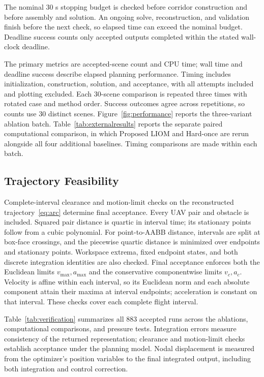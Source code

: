 The nominal 30 s stopping budget is checked before corridor construction and before assembly and solution. An ongoing solve, reconstruction, and validation finish before the next check, so elapsed time can exceed the nominal budget. Deadline success counts only accepted outputs completed within the stated wall-clock deadline.

The primary metrics are accepted-scene count and CPU time; wall time and deadline success describe elapsed planning performance. Timing includes initialization, construction, solution, and acceptance, with all attempts included and plotting excluded. Each 30-scene comparison is repeated three times with rotated case and method order. Success outcomes agree across repetitions, so counts use 30 distinct scenes. Figure~\ref{fig:performance} reports the three-variant ablation batch. Table~\ref{tab:externalresults} reports the separate paired computational comparison, in which Proposed LIOM and Hard-once are rerun alongside all four additional baselines. Timing comparisons are made within each batch.

\subsection{Trajectory Feasibility}
Complete-interval clearance and motion-limit checks on the reconstructed trajectory~\eqref{eq:arc} determine final acceptance. Every UAV pair and obstacle is included. Squared pair distance is quartic in interval time; its stationary points follow from a cubic polynomial. For point-to-AABB distance, intervals are split at box-face crossings, and the piecewise quartic distance is minimized over endpoints and stationary points. Workspace extrema, fixed endpoint states, and both discrete integration identities are also checked. Final acceptance enforces both the Euclidean limits $v_{\max},a_{\max}$ and the conservative componentwise limits $v_c,a_c$. Velocity is affine within each interval, so its Euclidean norm and each absolute component attain their maxima at interval endpoints; acceleration is constant on that interval. These checks cover each complete flight interval.

Table~\ref{tab:verification} summarizes all 883 accepted runs across the ablations, computational comparisons, and pressure tests. Integration errors measure consistency of the returned representation; clearance and motion-limit checks establish acceptance under the planning model. Nodal displacement is measured from the optimizer's position variables to the final integrated output, including both integration and control correction.


